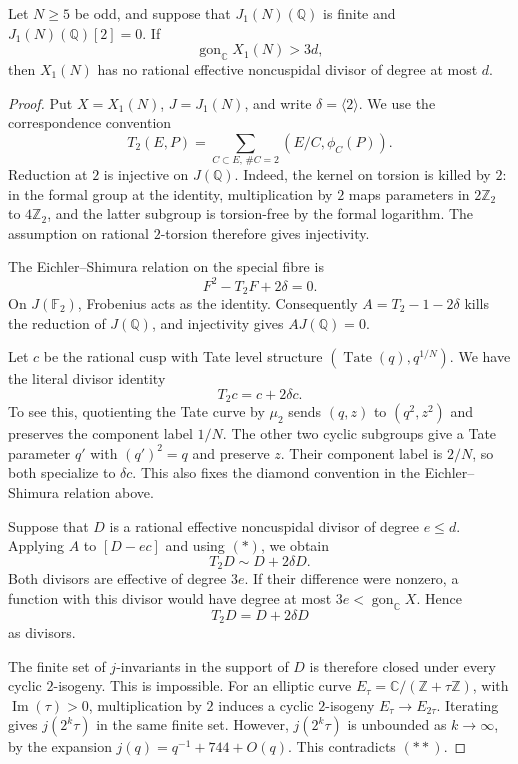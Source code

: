 \begin{lemma}\label{lem:nonic81-Hecke-finite-support}
Let $N\geq5$ be odd, and suppose that $J_1(N)(\mathbb Q)$ is finite
and $J_1(N)(\mathbb Q)[2]=0$. If
\[
 \operatorname{gon}_{\mathbb C}X_1(N)>3d,
\]
then $X_1(N)$ has no rational effective noncuspidal divisor of degree
at most $d$.
\end{lemma}
\begin{proof}
Put $X=X_1(N)$, $J=J_1(N)$, and write $\delta=\langle2\rangle$.
We use the correspondence convention
\[
 T_2(E,P)=\sum_{C\subset E,\,\#C=2}(E/C,\phi_C(P)).
\]
Reduction at $2$ is injective on $J(\mathbb Q)$.
Indeed, the kernel on torsion is killed by $2$: in the formal group
at the identity, multiplication by $2$ maps parameters in
$2\mathbb Z_2$ to $4\mathbb Z_2$, and the latter subgroup is
torsion-free by the formal logarithm. The assumption on rational
$2$-torsion therefore gives injectivity.

The Eichler--Shimura relation on the special fibre is
\[
 F^2-T_2F+2\delta=0.
\]
On $J(\mathbb F_2)$, Frobenius acts as the identity. Consequently
$A=T_2-1-2\delta$ kills the reduction of $J(\mathbb Q)$, and injectivity
gives $A J(\mathbb Q)=0$.

Let $c$ be the rational cusp with Tate level structure
$(\operatorname{Tate}(q),q^{1/N})$. We have the literal divisor identity
\[
 T_2c=c+2\delta c.                                      \tag{*}
\]
To see this, quotienting the Tate curve by $\mu_2$ sends
$(q,z)$ to $(q^2,z^2)$ and preserves the component label $1/N$.
The other two cyclic subgroups give a Tate parameter $q'$ with
$(q')^2=q$ and preserve $z$. Their component label is $2/N$,
so both specialize to $\delta c$. This also fixes the diamond
convention in the Eichler--Shimura relation above.

Suppose that $D$ is a rational effective noncuspidal divisor of
degree $e\leq d$. Applying $A$ to $[D-ec]$ and using $(*)$, we obtain
\[
 T_2D\sim D+2\delta D.
\]
Both divisors are effective of degree $3e$. If their difference were
nonzero, a function with this divisor would have degree at most
$3e<\operatorname{gon}_{\mathbb C}X$. Hence
\[
 T_2D=D+2\delta D                                      \tag{**}
\]
as divisors.

The finite set of $j$-invariants in the support of $D$ is therefore
closed under every cyclic $2$-isogeny. This is impossible.
For an elliptic curve $E_\tau=\mathbb C/(\mathbb Z+\tau\mathbb Z)$,
with $\operatorname{Im}(\tau)>0$, multiplication by $2$ induces a
cyclic $2$-isogeny $E_\tau\longrightarrow E_{2\tau}$.
Iterating gives $j(2^k\tau)$ in the same finite set. However,
$j(2^k\tau)$ is unbounded as $k\to\infty$, by the expansion
$j(q)=q^{-1}+744+O(q)$. This contradicts $(**)$.\qedhere
\end{proof}
